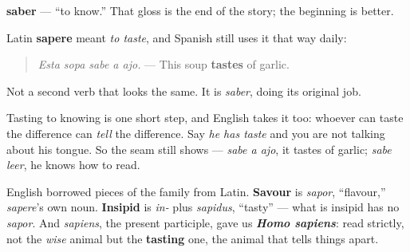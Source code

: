 \begin{cousinweb}
\textbf{saber} — \textquotedblleft{}to know.\textquotedblright{} That gloss is the end of the story; the beginning is better.

Latin \textbf{sapere} meant \emph{to taste}, and Spanish still uses it that way daily:

\begin{quote}
\emph{Esta sopa sabe a ajo.} — This soup \textbf{tastes} of garlic.
\end{quote}

Not a second verb that looks the same. It is \emph{saber}, doing its original job.

Tasting to knowing is one short step, and English takes it too: whoever can taste the difference can \emph{tell} the difference. Say \emph{he has taste} and you are not talking about his tongue. So the seam still shows — \emph{sabe a ajo}, it tastes of garlic; \emph{sabe leer}, he knows how to read.

English borrowed pieces of the family from Latin. \textbf{Savour} is \emph{sapor}, \textquotedblleft{}flavour,\textquotedblright{} \emph{sapere}'s own noun. \textbf{Insipid} is \emph{in-} plus \emph{sapidus}, \textquotedblleft{}tasty\textquotedblright{} — what is insipid has no \emph{sapor}. And \emph{sapiens}, the present participle, gave us \emph{\textbf{Homo sapiens}}: read strictly, not the \emph{wise} animal but the \textbf{tasting} one, the animal that tells things apart.
\end{cousinweb}

